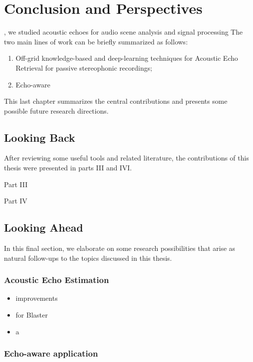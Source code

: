 \chapter{Conclusion and Perspectives}\label{ch:conclusion}


, we studied acoustic echoes for audio scene analysis and signal processing
The two main lines of work can be briefly summarized as follows:
\begin{enumerate}[label=(\Alph*)]
    \item Off-grid knowledge-based and deep-learning techniques for Acoustic Echo Retrieval for passive stereophonic recordings;
    \item Echo-aware
\end{enumerate}
This last chapter summarizes the central contributions and presents some possible future research directions.


\section{Looking Back}

After reviewing some useful tools and related literature, the contributions of this thesis were presented in parts III and IVI.


Part III


Part IV

\section{Looking Ahead}
In this final section, we elaborate on some research possibilities that arise as natural follow-ups to the topics discussed in this thesis.

\subsection{Acoustic Echo Estimation}

\begin{itemize}
    \item improvements
    \item for Blaster
\end{itemize}


\begin{itemize}
    \item a
\end{itemize}


\subsection{Echo-aware application}

